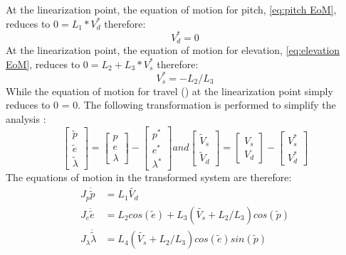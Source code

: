 At the linearization point, the equation of motion for pitch,
\cref{eq:pitch EoM}, reduces to $0 = L_{1} *
V^{*}_{d}$ therefore:
%
\begin{equation}
  \label{eq:V^*_d value}
  V^{*}_{d} = 0
\end{equation}
At the linearization point, the equation of motion for elevation,
\cref{eq:elevation EoM}, reduces to $0 = L_{2} +
L_{3}*V^{*}_{s}$ therefore:
%
\begin{equation}
  \label{eq:V^*_s value}
  V^{*}_{s} = -L_{2} / L_{3}
\end{equation}
%
While the equation of motion for travel () at the linearization point simply reduces to 0 = 0.
The following transformation is performed to simplify the analysis
\cite[p.14]{assignment}:
%
\begin{equation}
  \label{eq:transformation}
  \begin{bmatrix}
    \tilde{p} \\
    \tilde{e} \\
    \tilde{\lambda}
  \end{bmatrix}
  =
  \begin{bmatrix}
    p \\
    e \\
    \lambda
  \end{bmatrix}
  -
  \begin{bmatrix}
    p^{*} \\
    e^{*} \\
    \lambda^{*}
  \end{bmatrix}
  and
  \begin{bmatrix}
    \tilde{V}_{s} \\
    \tilde{V}_{d}
  \end{bmatrix}
  =
  \begin{bmatrix}
    V_{s} \\
    V_{d}
  \end{bmatrix}
  -
  \begin{bmatrix}
    V^{*}_{s} \\
    V^{*}_{d}
  \end{bmatrix}
\end{equation}
%
The equations of motion in the transformed system are therefore:
%
\begin{subequations}
  \begin{align}
    J_p\ddot{\tilde{p}} &= L_1\tilde{V_d}
    \label{eq:transformed pitch EoM}\\
    J_e\ddot{\tilde{e}} &=
    L_2cos(\tilde{e}) + L_3(\tilde{V_s}+L_2/L_3)cos(\tilde{p})
    \label{eq:transformed elevation EoM}\\
    J_{\lambda}\ddot{\tilde{\lambda}} &=
    L_4(\tilde{V_s}+L_2/L_3)cos(\tilde{e})sin(\tilde{p})
    \label{eq:transformed travel EoM}
  \end{align}
\end{subequations}
